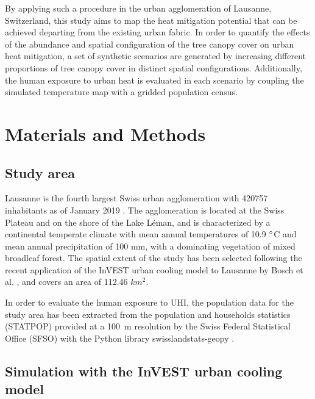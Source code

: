 \documentclass[10pt,letterpaper]{article}
\begin{document}
By applying such a procedure in the urban agglomeration of Lausanne, Switzerland, this study aims to map the heat mitigation potential that can be achieved departing from the existing urban fabric.
In order to quantify the effects of the abundance and spatial configuration of the tree canopy cover on urban heat mitigation, a set of synthetic scenarios are generated by increasing different proportions of tree canopy cover in distinct spatial configurations. %
Additionally, the human exposure to urban heat is evaluated in each scenario by coupling the simulated temperature map with a gridded population census.


\section*{Materials and Methods}

\subsection*{Study area}

Lausanne is the fourth largest Swiss urban agglomeration with 420757 inhabitants as of January 2019 \cite{sfso2018city}. The agglomeration is located at the Swiss Plateau and on the shore of the Lake L\'eman, and is characterized by a continental temperate climate with mean annual temperatures of 10.9 $\degree$C and mean annual precipitation of 100 mm, with a dominating vegetation of mixed broadleaf forest. The spatial extent of the study has been selected following the recent application of the InVEST urban cooling model to Lausanne by Bosch et al. \cite{bosch2020spatially}, and covers an area of 112.46 $km^2$.

In order to evaluate the human exposure to UHI, the population data for the study area has been extracted from the population and households statistics (STATPOP) \cite{sfso2020statistique} provided at a 100~m resolution by the Swiss Federal Statistical Office (SFSO) with the Python library swisslandstats-geopy \cite{bosch2019swisslandstats}. 


\subsection*{Simulation with the InVEST urban cooling model}
\end{document}
